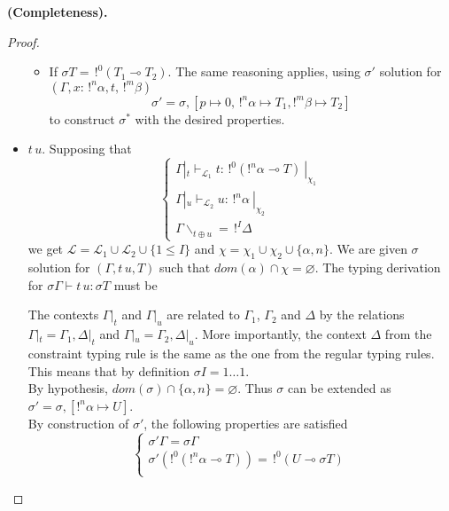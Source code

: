 \begin{prop}{\bf (Completeness).}
\begin{proof}
\begin{itemize}
\begin{itemize}
			\item If $\sigma T = \,!^0 (T_1 \multimap T_2)$.
				The same reasoning applies, using $\sigma'$ solution for $(\Gamma,x : \,!^n\alpha, t, \,!^m\beta)$
					$$\sigma' = \sigma, [p \mapsto 0, \,!^n\alpha \mapsto T_1, !^m\beta \mapsto T_2]$$
				to construct $\sigma^*$ with the desired properties.
			\end{itemize}
		
		\item $t \, u$. Supposing that
			$$\left\{ \begin{array}{l}
				\Gamma|_t \vdash_{\mathcal{L}_1} t : \,!^0(!^n\alpha \multimap T) ~|_{\chi_1} \\
				\Gamma|_u \vdash_{\mathcal{L}_2} u : \,!^n\alpha ~|_{\chi_2} \\
				\Gamma\backslash_{t \oplus u} = \,!^I\Delta
			\end{array} \right.$$
			we get $\mathcal{L} = \mathcal{L}_1 \cup \mathcal{L}_2 \cup \{ 1 \le I \}$ and
			$\chi = \chi_1 \cup \chi_2 \cup \{ \alpha, n\}$. We are given $\sigma$ solution for $(\Gamma, t \, u, T)$ such that
			$dom(\alpha) \cap \chi = \varnothing$.
			The typing derivation for $\sigma \Gamma \vdash t \, u : \sigma T$ must be
				\begin{prooftree}
				\end{prooftree}
			The contexts $\Gamma|_t$ and $\Gamma|_u$ are related to $\Gamma_1$, $\Gamma_2$ and $\Delta$ by the relations
			$\Gamma|_t = \Gamma_1, \Delta|_t$ and $\Gamma|_u = \Gamma_2, \Delta|_u$. More importantly, the context
			$\Delta$ from the constraint typing rule is the same as the one from the regular typing rules. This means
			that by definition $\sigma I = 1 \dots 1$. \\
			By hypothesis, $dom(\sigma) \cap \{ \alpha, n \} = \varnothing$. Thus $\sigma$ can be extended as
			$\sigma' = \sigma, [!^n\alpha \mapsto U]$. \\
			By construction of $\sigma'$, the following properties are satisfied
				$$\left\{ \begin{array}{l}
									   \sigma' \Gamma = \sigma \Gamma \\
									   \sigma'(!^0(!^n \alpha \multimap T)) = \,!^0 (U \multimap \sigma T) \\

\end{array}$$
\end{itemize}
\end{proof}
\end{prop}
